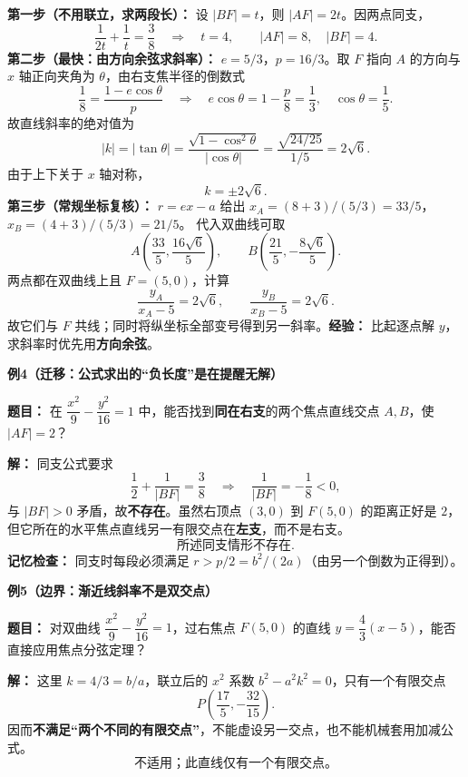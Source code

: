 \begin{examplebox}
  \textbf{第一步（不用联立，求两段长）：} 设 $|BF|=t$，则 $|AF|=2t$。因两点同支，
  \[
    \frac1{2t}+\frac1t=\frac38
    \quad\Longrightarrow\quad t=4,
    \qquad\boxed{|AF|=8,\quad |BF|=4}.
  \]
  \textbf{第二步（最快：由方向余弦求斜率）：} $e=5/3$，$p=16/3$。取 $F$ 指向 $A$ 的方向与 $x$ 轴正向夹角为 $\theta$，由右支焦半径的倒数式
  \[
    \frac18=\frac{1-e\cos\theta}{p}
    \quad\Longrightarrow\quad
    e\cos\theta=1-\frac p8=\frac13,
    \quad \cos\theta=\frac15.
  \]
  故直线斜率的绝对值为
  \[
    |k|=|\tan\theta|
       =\frac{\sqrt{1-\cos^2\theta}}{|\cos\theta|}
       =\frac{\sqrt{24/25}}{1/5}=2\sqrt6.
  \]
  由于上下关于 $x$ 轴对称，
  \[
    \boxed{k=\pm2\sqrt6}.
  \]
  \textbf{第三步（常规坐标复核）：} $r=ex-a$ 给出
  $x_A=(8+3)/(5/3)=33/5$，$x_B=(4+3)/(5/3)=21/5$。
  代入双曲线可取
  \[
    A\left(\frac{33}{5},\frac{16\sqrt6}{5}\right),\qquad
    B\left(\frac{21}{5},-\frac{8\sqrt6}{5}\right).
  \]
  两点都在双曲线上且 $F=(5,0)$，计算
  \[
    \frac{y_A}{x_A-5}=2\sqrt6,
    \qquad \frac{y_B}{x_B-5}=2\sqrt6.
  \]
  故它们与 $F$ 共线；同时将纵坐标全部变号得到另一斜率。\textbf{经验：} 比起逐点解 $y$，求斜率时优先用\textbf{方向余弦}。

  \medskip
\end{examplebox}\clearpage\begin{examplebox}
\begin{center}\end{center}
  \textbf{\textcolor{CExample}{例4（迁移：公式求出的“负长度”是在提醒无解）}}

  \textbf{题目：} 在 $\dfrac{x^2}{9}-\dfrac{y^2}{16}=1$ 中，能否找到\textbf{同在右支}的两个焦点直线交点 $A,B$，使 $|AF|=2$？

  \textbf{解：} 同支公式要求
  \[
    \frac12+\frac1{|BF|}=\frac38
    \quad\Longrightarrow\quad
    \frac1{|BF|}=-\frac18<0,
  \]
  与 $|BF|>0$ 矛盾，故\textbf{不存在}。虽然右顶点 $(3,0)$ 到 $F(5,0)$ 的距离正好是 $2$，但它所在的水平焦点直线另一有限交点在\textbf{左支}，而不是右支。
  \[
    \boxed{\text{所述同支情形不存在}}.
  \]
  \textbf{记忆检查：} 同支时每段必须满足 $r>p/2=b^2/(2a)$（由另一个倒数为正得到）。

  \medskip
\end{examplebox}\clearpage\begin{examplebox}
\begin{center}\end{center}
  \textbf{\textcolor{CExample}{例5（边界：渐近线斜率不是双交点）}}

  \textbf{题目：} 对双曲线 $\dfrac{x^2}{9}-\dfrac{y^2}{16}=1$，过右焦点 $F(5,0)$ 的直线 $y=\dfrac43(x-5)$，能否直接应用焦点分弦定理？

  \textbf{解：} 这里 $k=4/3=b/a$，联立后的 $x^2$ 系数 $b^2-a^2k^2=0$，只有一个有限交点
  \[
    P\left(\frac{17}{5},-\frac{32}{15}\right).
  \]
  因而\textbf{不满足“两个不同的有限交点”}，不能虚设另一交点，也不能机械套用加减公式。
  \[
    \boxed{\text{不适用；此直线仅有一个有限交点。}}
  \]
\end{examplebox}

